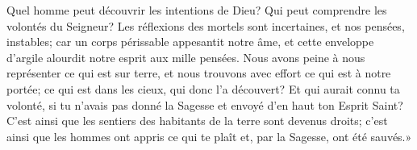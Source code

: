 Quel homme peut découvrir les intentions de Dieu?
Qui peut comprendre les volontés du Seigneur?
Les réflexions des mortels sont incertaines, et nos pensées, instables;
	car un corps périssable appesantit notre âme,
	et cette enveloppe d’argile alourdit notre esprit aux mille pensées.
Nous avons peine à nous représenter ce qui est sur terre,
	et nous trouvons avec effort ce qui est à notre portée;
	ce qui est dans les cieux, qui donc l’a découvert?
Et qui aurait connu ta volonté, si tu n’avais pas donné la Sagesse
	et envoyé d’en haut ton Esprit Saint?
C’est ainsi que les sentiers des habitants de la terre sont devenus droits;
	c’est ainsi que les hommes ont appris ce qui te plaît
	et, par la Sagesse, ont été sauvés.»
